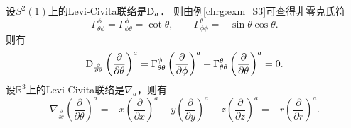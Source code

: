 设$S^2(1)$上的Levi-Civita联络是${\rm D}_a$．
则由例\ref{chrg:exm_S3}可查得非零克氏符
\begin{equation}
    \Gamma^\phi_{\theta\phi}= \Gamma^\phi_{\phi\theta} = \cot \theta, \qquad
    \Gamma^\theta_{\phi\phi}= - \sin \theta \cos\theta .
\end{equation}
则有
\begin{equation}\label{chsm:eqn_Dtt}
    {\rm D}_{\frac{\partial }{\partial \theta} }\left(\frac{\partial }{\partial \theta}\right)^a = 
    \Gamma^\phi_{\theta\theta}\left(\frac{\partial }{\partial \phi}\right)^a+
    \Gamma^\theta_{\theta\theta}\left(\frac{\partial }{\partial \theta}\right)^a = 0 .
\end{equation}
设$\mathbb{R}^3$上的Levi-Civita联络是$\nabla_a$，则有
\begin{equation}\label{chsm:eqn_nablatt}
    \nabla_{\frac{\partial }{\partial \theta} }\left(\frac{\partial }{\partial \theta}\right)^a
    =-x \left(\frac{\partial }{\partial x}\right)^a
    -y\left(\frac{\partial }{\partial y}\right)^a
    -z\left(\frac{\partial }{\partial z}\right)^a 
    =-r \left(\frac{\partial }{\partial r}\right)^a .
\end{equation}
